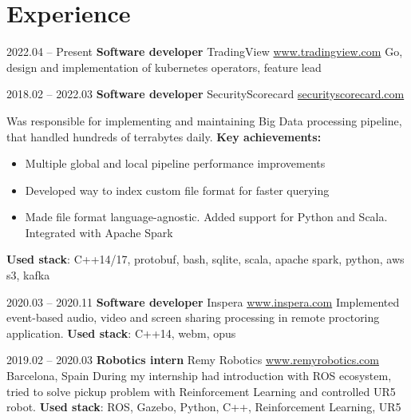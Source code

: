\documentclass[11pt,a4paper]{moderncv}
\newcommand{\EngRus}[2]{#1}
\newcommand{\SunshinePalace}{\EngRus{Barcelona, Spain}{Барселона, Испания}}
\newcommand{\UsedStack}{\textbf{\EngRus{Used stack}{Используемый Стек}}: }
\newcommand{\WorkSingleDate}[2]{\small{\EngRus{#2.#1}{#1.#2}}}
\newcommand{\WorkDate}[4]{\small{\EngRus{#2.#1 -- #4.#3}{#1.#2 -- #3.#4}}}
\begin{document}
\maketitle
\section{\EngRus{Experience}{Опыт}}
\cventry
{\WorkSingleDate{04}{2022} -- \EngRus{Present}{н.в.}}
{\bfseries \EngRus{Software developer}{Разработчик ПО}}
{TradingView \url{www.tradingview.com}}{}{}
{
  \EngRus{Go, design and implementation of kubernetes operators, feature lead}
  {Go, проектирование и разработка операторов kubernetes, feature lead}
}

\cventry
{\WorkDate{02}{2018}{03}{2022}}
{\bfseries \EngRus{Software developer}{Разработчик ПО}}
{SecurityScorecard \url{securityscorecard.com}}{}{}
{
  \EngRus{Was responsible for implementing and maintaining Big Data processing pipeline, that handled hundreds of terrabytes daily.}
  {Разрабатывал и поддерживал пайплайн для больших данных, который обрабатывал сотни террабайт в день.}
  \newline{}\textbf{\EngRus{Key achievements}{Ключевые достижения}:}
  \begin{itemize}
    \item \EngRus{Multiple global and local pipeline performance improvements}{Множественные глобальные и локальные улучшения производительности пайплайна}
    \item \EngRus{Developed way to index custom file format for faster querying}{Реализовал индексацию файлов для быстрого поиска интересующих событий}
    \item \EngRus{Made file format language-agnostic. Added support for Python and Scala. Integrated with Apache Spark}
          {Упростил формат файла, добавил поддержку Python и Scala. Интегрировал формат с Apache Spark}
  \end{itemize}
  \UsedStack{} C++14/17, protobuf, bash, sqlite, scala, apache spark, python, aws s3, kafka
}

\cventry
{\WorkDate{03}{2020}{11}{2020}}
{\bfseries \EngRus{Software developer}{Разработчик ПО}}
{Inspera \url{www.inspera.com}}{}{}
{
  \EngRus{Implemented event-based audio, video and screen sharing processing in remote proctoring application.}
  {Реализовывал событийную обработку аудио, видео в приложении удалённого тестирования.}
  \newline{}\UsedStack{} C++14, webm, opus
}

\cventry
{\WorkDate{02}{2019}{03}{2020}}
{\bfseries \EngRus{Robotics intern}{Стажёр робототехники}}
{Remy Robotics \url{www.remyrobotics.com}} { \SunshinePalace }{}
{\EngRus{During my internship had introduction with ROS ecosystem, tried to solve pickup problem with Reinforcement Learning and controlled UR5 robot.}
  {Во время стажировки познакомился с экосистемой ROS, использовал обучение с подкреплением для решения задачи захвата объектов и управлял роботом UR5.}
  \newline{}\UsedStack{} ROS, Gazebo, Python, C++, \EngRus{Reinforcement Learning}{Обучение с подкреплением}, UR5}
\end{document}

